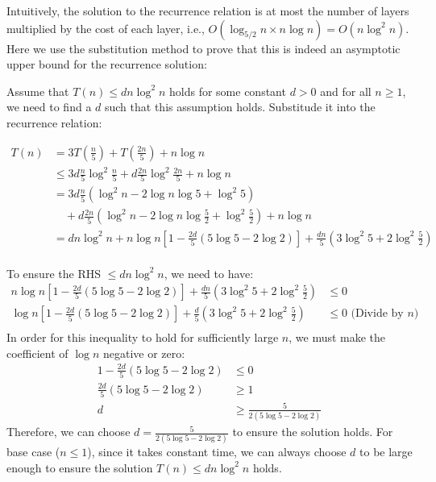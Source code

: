 \documentclass[11pt, a4paper, oneside]{memoir}
\begin{document}
Intuitively, the solution to the recurrence relation is at most the number of layers multiplied by the cost of each layer,
i.e., $O(\log_{5/2} n \times n \log n) = O(n \log^2 n)$. Here we use the substitution method to prove that this is indeed an asymptotic upper bound for the recurrence solution:

Assume that $T(n) \leq dn \log^2 n$ holds for some constant $d > 0$ and for all $n \geq 1$, we need to find a $d$ such that this assumption holds.
Substitude it into the recurrence relation:

\begin{align*}
    T(n) &= 3T(\frac{n}{5}) + T(\frac{2n}{5}) +  n \log n \\
    &\leq 3d\frac{n}{5} \log^2 \frac{n}{5} + d\frac{2n}{5} \log^2 \frac{2n}{5} + n \log n \\
    &=3d\frac{n}{5} (\log^2 n - 2 \log n \log 5 + \log^2 5) \\
    &\quad+d\frac{2n}{5} (\log^2 n - 2 \log n \log \frac{5}{2} + \log^2 \frac{5}{2}) + n \log n \\
    &= dn \log^2 n + n \log n [1-\frac{2d}{5}(5\log 5 - 2\log 2)] + \frac{dn}{5}(3\log^2 5 + 2\log^2 \frac{5}{2}) \\
\end{align*}

To ensure the RHS $\leq dn \log^2 n$, we need to have:
\begin{align*}
    n \log n [1-\frac{2d}{5}(5\log 5 - 2\log 2)] + \frac{dn}{5}(3\log^2 5 + 2\log^2 \frac{5}{2}) &\leq 0 \\
    \log n [1-\frac{2d}{5}(5\log 5 - 2\log 2)] + \frac{d}{5}(3\log^2 5 + 2\log^2 \frac{5}{2}) &\leq 0 \text{ (Divide by $n$)} \\
\end{align*}
In order for this inequality to hold for sufficiently large $n$, we must make the coefficient of $\log n$ negative or zero:
\begin{align*}
    1-\frac{2d}{5}(5\log 5 - 2\log 2) &\leq 0 \\
    \frac{2d}{5}(5\log 5 - 2\log 2) &\geq 1 \\
    d &\geq \frac{5}{2(5\log 5 - 2\log 2)}
\end{align*}
Therefore, we can choose $d = \frac{5}{2(5\log 5 - 2\log 2)}$ to ensure the solution holds.
For base case ($n \leq 1$)\footnotemark, since it takes constant time, we can always choose $d$ to be large enough to ensure the solution $T(n) \leq dn \log^2 n$ holds.

\end{document}
